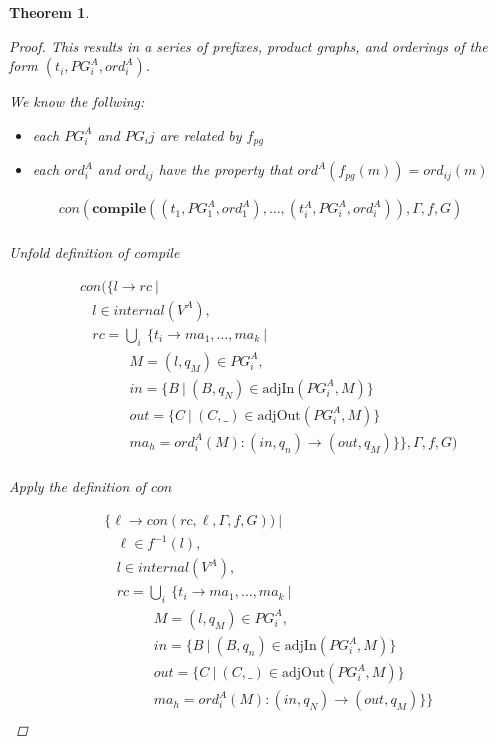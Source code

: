 \documentclass[twocolumn, openany]{sig-alternate-10pt}
\newtheorem{thm}{Theorem}
\begin{document}
\begin{thm}
\begin{proof}
    This results in a series of prefixes, product graphs, and orderings of the form $(t_i, PG^A_i, ord^A_i)$.

    We know the follwing:

    \begin{itemize}
      \item each $PG^A_i$ and $PG_ij$ are related by $f_{pg}$
      \item each $ord^A_i$ and $ord_{ij}$ have the property that $ord^A(f_{pg}(m)) = ord_{ij}(m)$
    \end{itemize}
    


  \[ \begin{array}{l}
     con(\textbf{compile}( (t_1,PG^A_1,ord^A_1), \dots, (t^A_i,PG^A_i,ord^A_i) ), \Gamma,f,G) \\
  \end{array} \]%

Unfold definition of compile

  \[ \begin{array}{l}
     ~~~~~ con(\{ l \rightarrow rc ~\vert~ \\
     ~~~~~~~~~ l \in internal(V^A), \\
     ~~~~~~~~~ rc = \bigcup_i~ \{ t_i \rightarrow ma_1, \dots, ma_k ~\vert~ \\
     ~~~~~~~~~~~~~~~~~~~~~ M = (l,q_M) \in PG^A_i, \\
     ~~~~~~~~~~~~~~~~~~~~~ in = \{ B ~\vert~ (B,q_N) \in \text{adjIn}(PG^A_i,M) \} \\
     ~~~~~~~~~~~~~~~~~~~~~ out = \{ C ~\vert~ (C,\_) \in \text{adjOut}(PG^A_i,M) \} \\
     ~~~~~~~~~~~~~~~~~~~~~ ma_h = ord^A_i(M) : (in,q_n) \rightarrow (out,q_M) \} \}, \Gamma,f,G) \\
  \end{array} \]%

  Apply the definition of $con$

  \[ \begin{array}{l}
     ~~~~~ \{ \ell \rightarrow con(rc,\ell,\Gamma,f,G)) ~\vert~ \\
     ~~~~~~~~~ \ell \in f^{-1}(l), \\
     ~~~~~~~~~ l \in internal(V^A), \\
     ~~~~~~~~~ rc = \bigcup_i~ \{ t_i \rightarrow ma_1, \dots, ma_k ~\vert~ \\
     ~~~~~~~~~~~~~~~~~~~~~ M = (l,q_M) \in PG^A_i, \\
     ~~~~~~~~~~~~~~~~~~~~~ in = \{ B ~\vert~ (B,q_n) \in \text{adjIn}(PG^A_i,M) \} \\
     ~~~~~~~~~~~~~~~~~~~~~ out = \{ C ~\vert~ (C,\_) \in \text{adjOut}(PG^A_i,M) \} \\
     ~~~~~~~~~~~~~~~~~~~~~ ma_h = ord^A_i(M) : (in,q_N) \rightarrow (out,q_M) \} \} \\
  \end{array} \]%


\end{proof}
\end{thm}
\end{document}
